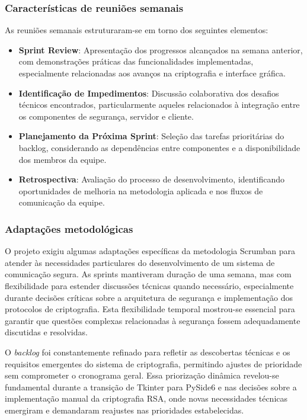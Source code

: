 \subsubsection{Características de reuniões semanais}

As reuniões semanais estruturaram-se em torno dos seguintes elementos:

\begin{itemize}
  \item \textbf{Sprint Review}: Apresentação dos progressos
    alcançados na semana anterior, com demonstrações práticas das
    funcionalidades implementadas, especialmente relacionadas aos
    avanços na criptografia e interface gráfica.
  \item \textbf{Identificação de Impedimentos}: Discussão
    colaborativa dos desafios técnicos encontrados, particularmente
    aqueles relacionados à integração entre os componentes de
    segurança, servidor e cliente.
  \item \textbf{Planejamento da Próxima Sprint}: Seleção das tarefas
    prioritárias do backlog, considerando as dependências entre
    componentes e a disponibilidade dos membros da equipe.
  \item \textbf{Retrospectiva}: Avaliação do processo de
    desenvolvimento, identificando oportunidades de melhoria na
    metodologia aplicada e nos fluxos de comunicação da equipe.
\end{itemize}

\subsubsection{Adaptações metodológicas}

O projeto exigiu algumas adaptações específicas da metodologia
Scrumban para atender às necessidades particulares do desenvolvimento
de um sistema de comunicação segura. As sprints mantiveram duração de
uma semana, mas com flexibilidade para estender discussões técnicas
quando necessário, especialmente durante decisões críticas sobre a
arquitetura de segurança e implementação dos protocolos de
criptografia. Esta flexibilidade temporal mostrou-se essencial para
garantir que questões complexas relacionadas à segurança fossem
adequadamente discutidas e resolvidas.

O \textit{backlog} foi constantemente refinado para refletir as descobertas
técnicas e os requisitos emergentes do sistema de criptografia,
permitindo ajustes de prioridade sem comprometer o cronograma geral.
Essa priorização dinâmica revelou-se fundamental durante a transição
de Tkinter para PySide6 e nas decisões sobre a implementação manual
da criptografia \acs{RSA}, onde novas necessidades técnicas emergiram e
demandaram reajustes nas prioridades estabelecidas.

